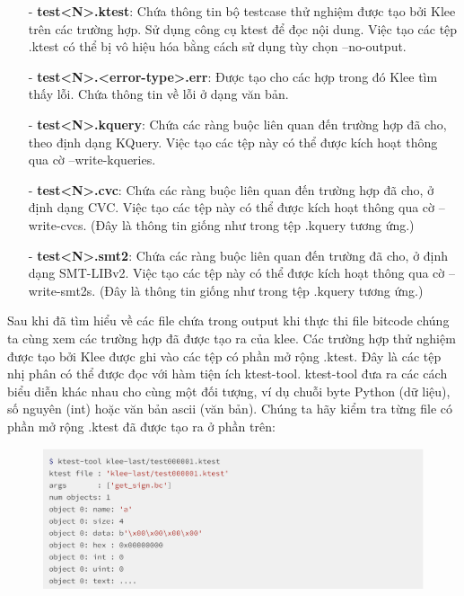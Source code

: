 \documentclass[12pt,a4paper]{article}
\begin{document}
\begin{itemize}
\item[-] \textbf{test<N>.ktest}: Chứa thông tin bộ testcase thử nghiệm được tạo bởi Klee trên các trường hợp. Sử dụng công cụ ktest để đọc nội dung. Việc tạo các tệp .ktest có thể bị vô hiệu hóa bằng cách sử dụng tùy chọn --no-output.
\item[-] \textbf{test<N>.<error-type>.err}: Được tạo cho các  hợp trong đó Klee tìm thấy lỗi. Chứa thông tin về lỗi ở dạng văn bản.
\item[-] \textbf{test<N>.kquery}: Chứa các ràng buộc liên quan đến trường hợp đã cho, theo định dạng KQuery. Việc tạo các tệp này có thể được kích hoạt thông qua cờ --write-kqueries.
\item[-] \textbf{test<N>.cvc}: Chứa các ràng buộc liên quan đến trường hợp đã cho, ở định dạng CVC. Việc tạo các tệp này có thể được kích hoạt thông qua cờ --write-cvcs. (Đây là thông tin giống như trong tệp .kquery tương ứng.)
\item[-] \textbf{test<N>.smt2}: Chứa các ràng buộc liên quan đến trường đã cho, ở định dạng SMT-LIBv2. Việc tạo các tệp này có thể được kích hoạt thông qua cờ --write-smt2s. (Đây là thông tin giống như trong tệp .kquery tương ứng.)
\end{itemize}

Sau khi đã tìm hiểu về các file chứa trong output khi thực thi file bitcode chúng ta cùng xem các trường hợp đã được tạo ra của klee. Các trường hợp thử nghiệm được tạo bởi Klee được ghi vào các tệp có phần mở rộng .ktest. Đây là các tệp nhị phân có thể được đọc với hàm tiện ích ktest-tool. ktest-tool đưa ra các cách biểu diễn khác nhau cho cùng một đối tượng, ví dụ chuỗi byte Python (dữ liệu), số nguyên (int) hoặc văn bản ascii (văn bản). Chúng ta hãy kiểm tra từng file có phần mở rộng .ktest đã được tạo ra ở phần trên:

\begin{figure}[ht]
\begin{center}
\includegraphics[scale=.3]{hinhanh/test1.png}
\end{center}
\end{figure}
\end{document}
